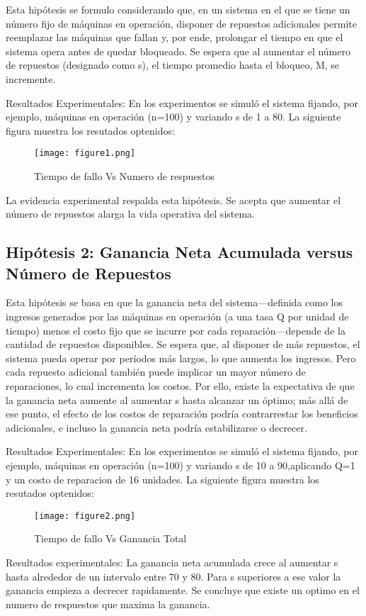 \documentclass[a4paper,12pt]{article}
\begin{document}
			Esta hipótesis se formulo considerando que, en un sistema en el que se tiene un número fijo de máquinas en operación, disponer de repuestos adicionales permite reemplazar las máquinas que fallan y, por ende, prolongar el tiempo en que el sistema opera antes de quedar bloqueado. Se espera que al aumentar el número de repuestos (designado como s), el tiempo promedio hasta el bloqueo, M, se incremente.
			\newline
			\newline
			
			Resultados Experimentales: En los experimentos se simuló el sistema fijando, por ejemplo,  máquinas en operación (n=100) y variando s
			de 1 a 80. La siguiente figura muestra los resutados optenidos:
			\begin{figure}[H]
				\centering
				\texttt{[image: figure1.png]}
				\caption{Tiempo de fallo Vs Numero de respuestos}
				\label{fig:Tiempo de fallo Vs Numero de respuestos}
			\end{figure}
			
		La evidencia experimental respalda esta hipótesis. Se acepta que aumentar el número de repuestos alarga la vida operativa del sistema.
			
		\subsection{Hipótesis 2: Ganancia Neta Acumulada versus Número de Repuestos}
		Esta hipótesis se basa en que la ganancia neta del sistema—definida como los ingresos generados por las máquinas en operación (a una tasa 
		Q
		por unidad de tiempo) menos el costo fijo que se incurre por cada reparación—depende de la cantidad de repuestos disponibles. Se espera que, al disponer de más repuestos, el sistema pueda operar por períodos más largos, lo que aumenta los ingresos. Pero cada repuesto adicional también puede implicar un mayor número de reparaciones, lo cual incrementa los costos. Por ello, existe la expectativa de que la ganancia neta aumente al aumentar s
		hasta alcanzar un óptimo; más allá de ese punto, el efecto de los costos de reparación podría contrarrestar los beneficios adicionales, e incluso la ganancia neta podría estabilizarse o decrecer.
		\newline
		\newline
		
		Resultados Experimentales: En los experimentos se simuló el sistema fijando, por ejemplo,  máquinas en operación (n=100) y variando s
		de 10 a 90,aplicando Q=1 y un costo de reparacion de 16 unidades. La siguiente figura muestra los resutados optenidos:
		\begin{figure}[H]
			\centering
			\texttt{[image: figure2.png]}
			\caption{Tiempo de fallo Vs Ganancia Total}
			\label{fig:Tiempo de fallo Vs Ganancia Total}
		\end{figure}
		
		Resultados experimentales: La ganancia neta acumulada crece al aumentar s hasta alrededor de un intervalo entre 70 y 80. Para s superiores a ese valor la ganancia empieza a decrecer rapidamente.
		\newline
		Se concluye que existe un optimo en el numero de respuestos que maxima la ganancia.
			
	
\end{document}
